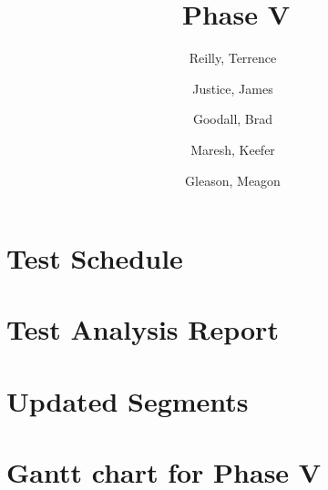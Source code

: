 \documentclass[a4paper,12pt]{article}
\author{%
    Reilly, Terrence\
    \and
    Justice, James\
    \and
    Goodall, Brad\
    \and
    Maresh, Keefer\
    \and
    Gleason, Meagon\
}
\title{Phase V}
\begin{document}
    \maketitle

    \section*{Test Schedule}
        

    \section*{Test Analysis Report}
        

    \section*{Updated Segments}
        

    \section*{Gantt chart for Phase V}
        
\end{document}
